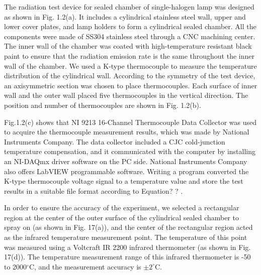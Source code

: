 The radiation test device for sealed chamber of single-halogen lamp  was designed as shown in Fig. 1.2(a). It includes a cylindrical stainless steel wall, upper and lower cover plates, and lamp holders to form a cylindrical sealed chamber.
All the components were made of SS304 stainless steel through a CNC machining center. The inner wall of the chamber was coated with high-temperature resistant black paint to ensure that the radiation emission rate is the same throughout the inner wall of the chamber.
We used a K-type thermocouple to measure the temperature distribution of the cylindrical wall.
According to the symmetry of the test device, an axisymmetric section was chosen to place thermocouples. Each surface of inner wall and the outer wall placed five thermocouples in the vertical direction. The position and number of thermocouples are shown in Fig. 1.2(b).

Fig.1.2(c) shows that  NI 9213 16-Channel Thermocouple Data Collector was used to acquire the thermocouple measurement results, which was made by National Instruments Company. The data collector included a CJC cold-junction temperature compensation, and it communicated with the computer by installing an NI-DAQmx driver software on the PC side. National Instruments Company also offers LabVIEW programmable software. Writing a program converted the K-type thermocouple voltage signal to a temperature value and store the test results in a suitable file format according to Equation? ? .

In order to ensure the accuracy of the experiment, we selected a rectangular region at the center of the outer surface of the cylindrical sealed chamber to spray on (as shown in Fig. 17(a)), and the center of the rectangular region acted as the infrared temperature measurement point.
The temperature of this point was measured using a Voltcraft IR 2200 infrared thermometer (as shown in Fig. 17(d)).
The temperature measurement range of this infrared thermometer is -50 to 2000$^{\circ}$C, and the measurement accuracy is $\pm2^{\circ}$C.

